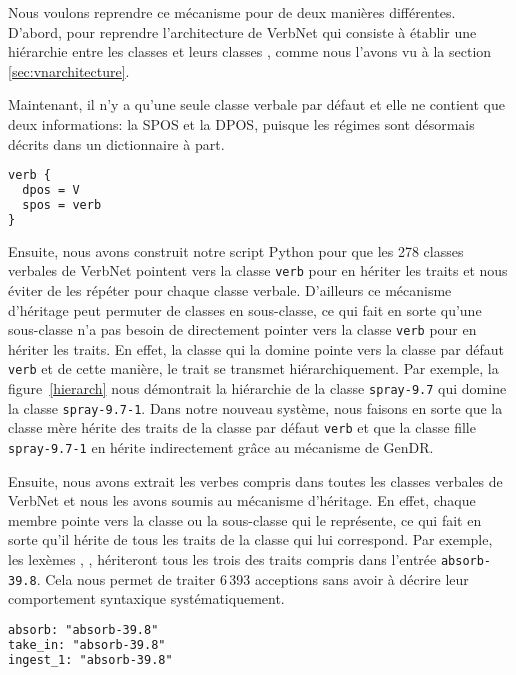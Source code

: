 Nous voulons reprendre ce mécanisme pour de deux manières différentes. D'abord, pour reprendre l'architecture de VerbNet qui consiste à établir une hiérarchie entre les classes  et leurs classes , comme nous l'avons vu à la section \ref{sec:vnarchitecture}.

Maintenant, il n'y a qu'une seule classe verbale par défaut et elle ne contient que deux informations: la \ac{SPOS} et la \ac{DPOS}, puisque les régimes sont désormais décrits dans un dictionnaire à part.

\begin{lstlisting}[language=XML, caption=Classe par défaut des verbes]
verb {
  dpos = V
  spos = verb
}
\end{lstlisting}

Ensuite, nous avons construit notre script Python pour que les 278 classes verbales de VerbNet pointent vers la classe \texttt{verb} pour en hériter les traits et nous éviter de les répéter pour chaque classe verbale. D'ailleurs ce mécanisme d'héritage peut permuter de classes en sous-classe, ce qui fait en sorte qu'une sous-classe n'a pas besoin de directement pointer vers la classe \texttt{verb} pour en hériter les traits. En effet, la classe qui la domine pointe vers la classe par défaut \texttt{verb} et de cette manière, le trait se transmet hiérarchiquement. Par exemple, la figure~\ref{hierarch} nous démontrait la hiérarchie de la classe \texttt{spray-9.7} qui domine la classe \texttt{spray-9.7-1}. Dans notre nouveau système, nous faisons en sorte que la classe mère hérite des traits de la classe par défaut \texttt{verb} et que la classe fille \texttt{spray-9.7-1} en hérite indirectement grâce au mécanisme de GenDR.

Ensuite, nous avons extrait les verbes compris dans toutes les classes verbales de VerbNet et nous les avons soumis au mécanisme d'héritage. En effet, chaque membre pointe vers la classe ou la sous-classe qui le représente, ce qui fait en sorte qu'il hérite de tous les traits de la classe qui lui correspond. Par exemple, les lexèmes , ,  hériteront tous les trois des traits compris dans l'entrée \texttt{absorb-39.8}. Cela nous permet de traiter 6\,393 acceptions sans avoir à décrire leur comportement syntaxique systématiquement.

\begin{lstlisting}[language=XML]
absorb: "absorb-39.8"
take_in: "absorb-39.8"
ingest_1: "absorb-39.8"
\end{lstlisting}

